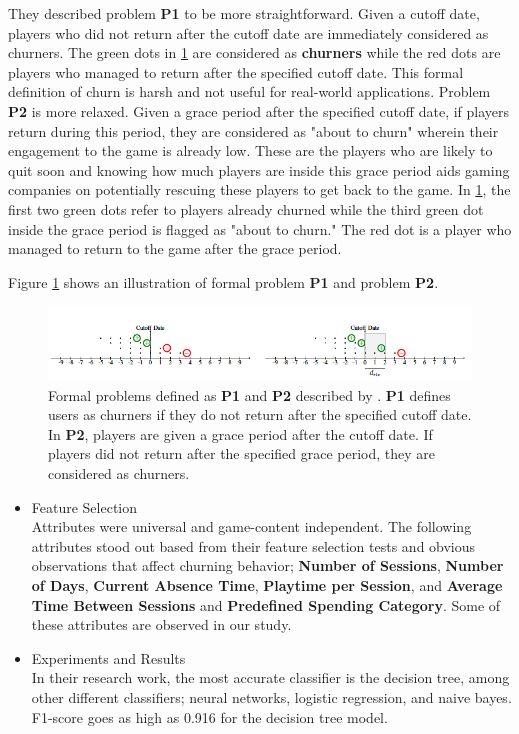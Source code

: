 They described problem \textbf{P1} to be more straightforward. Given a cutoff date, players who did not return after the cutoff date are immediately considered as churners. The green dots in \ref{fig:churn_figure} are considered as \textbf{churners} while the red dots are players who managed to return after the specified cutoff date. This formal definition of churn is harsh and not useful for real-world applications. Problem \textbf{P2} is more relaxed. Given a grace period after the specified cutoff date, if players return during this period, they are considered as "about to churn" wherein their engagement to the game is already low. These are the players who are likely to quit soon and knowing how much players are inside this grace period aids gaming companies on potentially rescuing these players to get back to the game. In \ref{fig:churn_figure}, the first two green dots refer to players already churned while the third green dot inside the grace period is flagged as "about to churn." The red dot is a player who managed to return to the game after the grace period.

Figure \ref{fig:churn_figure} shows an illustration of formal problem \textbf{P1} and problem \textbf{P2}.

\begin{figure}[h]
\centering
\includegraphics[scale=0.6]{figures/churn.png}
\caption{Formal problems defined as \textbf{P1} and \textbf{P2} described by \cite{ref:predicting_player_churn}. \textbf{P1} defines users as churners if they do not return after the specified cutoff date. In \textbf{P2}, players are given a grace period after the cutoff date. If players did not return after the specified grace period, they are considered as churners. }
\label{fig:churn_figure}
\end{figure}


\begin{itemize}
\item Feature Selection \\
Attributes were universal and game-content independent. The following attributes stood out based from their feature selection tests and obvious observations that affect churning behavior; \textbf{Number of Sessions}, \textbf{Number of Days}, \textbf{Current Absence Time}, \textbf{Playtime per Session}, and \textbf{Average Time Between Sessions} and \textbf{Predefined Spending Category}. Some of these attributes are observed in our study.

\item Experiments and Results \\
In their research work, the  most accurate classifier is the decision tree, among other different classifiers; neural networks, logistic regression, and naive bayes. F1-score goes as high as 0.916 for the decision tree model. 
\end{itemize}


